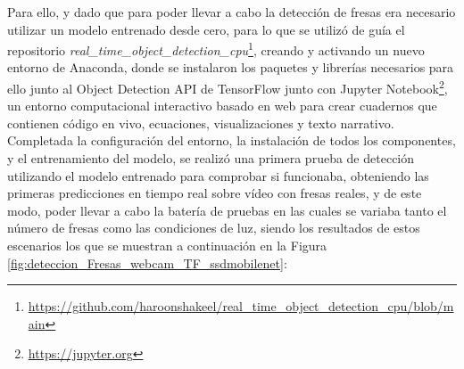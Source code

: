 Para ello, y dado que para poder llevar a cabo la detección de fresas era necesario utilizar un modelo entrenado desde cero, para lo que se utilizó de guía el repositorio \textit{real\_time\_object\_detection\_cpu}\footnote{\url{https://github.com/haroonshakeel/real_time_object_detection_cpu/blob/main}}, creando y activando un nuevo entorno de Anaconda, donde se instalaron los paquetes y librerías necesarios para ello junto al Object Detection API de TensorFlow junto con Jupyter Notebook\footnote{\url{https://jupyter.org}}, un entorno computacional interactivo basado en web para crear cuadernos que contienen código en vivo, ecuaciones, visualizaciones y texto narrativo. \\

Completada la configuración del entorno, la instalación de todos los componentes, y el entrenamiento del modelo, se realizó una primera prueba de detección utilizando el modelo entrenado para comprobar si funcionaba, obteniendo las primeras predicciones en tiempo real sobre vídeo con fresas reales, y de este modo, poder llevar a cabo la batería de pruebas en las cuales se variaba tanto el número de fresas como las condiciones de luz, siendo los resultados de estos escenarios los que se muestran a continuación en la Figura \ref{fig:deteccion_Fresas_webcam_TF_ssdmobilenet}:
\pagebreak


